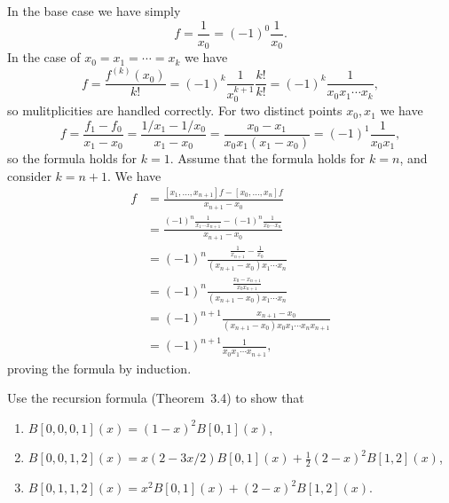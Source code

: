 \begin{solution}{3.3}
    In the base case we have simply
    \begin{equation*}
        [x_0]f = \frac{1}{x_0} = (-1)^0 \frac{1}{x_0}.
    \end{equation*}
    In the case of $x_0 = x_1 = \cdots = x_k$ we have
    \begin{equation*}
        [\underbrace{x_0, x_0, \ldots, x_0}_{k+1}]f = \frac{f^{(k)}(x_0)}{k!} = (-1)^k \frac{1}{x_0^{k+1}} \frac{k!}{k!} = (-1)^k \frac{1}{x_0 x_1 \cdots x_k},
    \end{equation*}
    so mulitplicities are handled correctly.
    For two distinct points $x_0, x_1$ we have
    \begin{equation*}
        [x_0, x_1]f = \frac{f_1 - f_0}{x_1 - x_0} = \frac{1/x_1 - 1/x_0}{x_1 - x_0} = \frac{x_0 - x_1}{x_0 x_1 (x_1 - x_0)} = (-1)^1 \frac{1}{x_0 x_1},
    \end{equation*}
    so the formula holds for $k = 1$.
    Assume that the formula holds for $k = n$, and consider $k = n + 1$.
    We have
    \begin{align*}
        [x_0, \ldots, x_{n+1}]f
        &= \frac{[x_1, \ldots, x_{n+1}]f - [x_0, \ldots, x_{n}]f}{x_{n+1} - x_0} \\
        &= \frac{(-1)^n \frac{1}{x_1 \cdots x_{n+1}} - (-1)^n \frac{1}{x_0 \cdots x_n}}{x_{n+1} - x_0} \\
        &= (-1)^n \frac{
            \frac{1}{x_{n+1}} - \frac{1}{x_0}
        }{
            (x_{n+1} - x_0) x_1 \cdots x_n
        } \\
        &= (-1)^n  \frac{
            \frac{x_0 - x_{n+1}}{x_0 x_{n+1}}
        }{
            (x_{n+1} - x_0) x_1 \cdots x_n
        } \\
        &= (-1)^{n+1}\frac{
            x_{n+1} - x_0
        }{
            (x_{n+1} - x_0) x_0 x_1 \cdots x_n x_{n+1}
        } \\
        &= (-1)^{n+1}\frac{1}{x_0 x_1 \cdots x_{n+1}},
    \end{align*}
    proving the formula by induction.
\end{solution}

\begin{exercise}{3.5}
    Use the recursion formula (Theorem~3.4) to show that
    \begin{enumerate}[
    label=\alph*) %
            ] %
        \item $B[0, 0, 0, 1](x) = (1 - x)^2 B[0, 1](x)$,
        \item $B[0, 0, 1, 2](x) = x(2 - 3x/2)B[0, 1](x) + \frac{1}{2}(2 - x)^2B[1, 2](x)$,
        \item $B[0, 1, 1, 2](x) = x^2B[0, 1](x) + (2 - x)^2B[1, 2](x)$.
    \end{enumerate}
\end{exercise}

